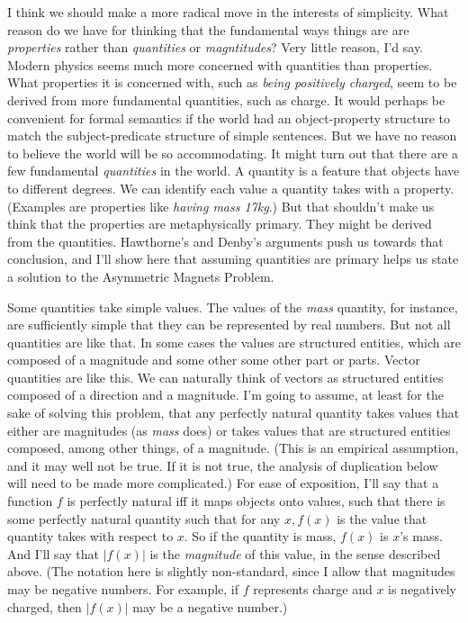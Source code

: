 I think we should make a more radical move in the interests of simplicity. What reason do we have for thinking that the fundamental ways things are are \textit{properties} rather than \textit{quantities} or \textit{magntitudes}? Very little reason, I'd say. Modern physics seems much more concerned with quantities than properties. What properties it is concerned with, such as \textit{being positively charged}, seem to be derived from more fundamental quantities, such as charge. It would perhaps be convenient for formal semantics if the world had an object-property structure to match the subject-predicate structure of simple sentences. But we have no reason to believe the world will be so accommodating. It might turn out that there are a few fundamental \textit{quantities} in the world. A quantity is a feature that objects have to different degrees. We can identify each value a quantity takes with a property. (Examples are properties like \textit{having mass 17kg}.) But that shouldn't make us think that the properties are metaphysically primary. They might be derived from the quantities. Hawthorne's and Denby's arguments push us towards that conclusion, and I'll show here that assuming quantities are primary helps us state a solution to the Asymmetric Magnets Problem.

Some quantities take simple values. The values of the \textit{mass} quantity, for instance, are sufficiently simple that they can be represented by real numbers. But not all quantities are like that. In some cases the values are structured entities, which are composed of a magnitude and some other some other part or parts. Vector quantities are like this. We can naturally think of vectors as structured entities composed of a direction and a magnitude. I'm going to assume, at least for the sake of solving this problem, that any perfectly natural quantity takes values that either are magnitudes (as \textit{mass} does) or takes values that are structured entities composed, among other things, of a magnitude. (This is an empirical assumption, and it may well not be true. If it is not true, the analysis of duplication below will need to be made more complicated.) For ease of exposition, I'll say that a function \(f\) is perfectly natural iff it maps objects onto values, such that there is some perfectly natural quantity such that for any \(x, f(x)\) is the value that quantity takes with respect to \(x\). So if the quantity is mass, \(f(x)\) is \(x\)'s mass. And I'll say that \(|f(x)|\) is the \textit{magnitude} of this value, in the sense described above. (The notation here is slightly non-standard, since I allow that magnitudes may be negative numbers. For example, if \(f\) represents charge and \(x\) is negatively charged, then \(|f(x)|\) may be a negative number.)

